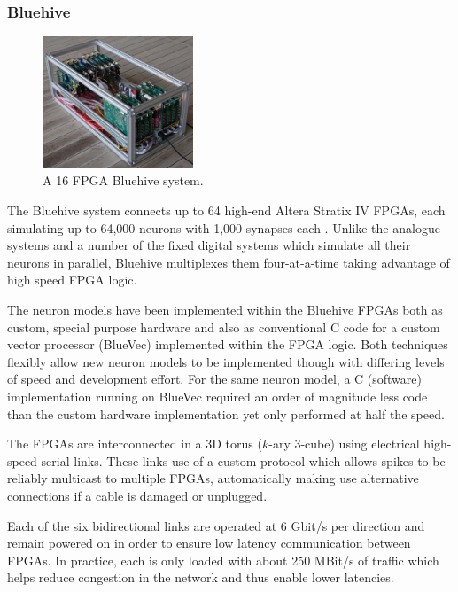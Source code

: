 			\subsubsection{Bluehive}
				
				\begin{figure}
					\center
					\includegraphics[width=0.4\textwidth]{figures/bluehive}
					
					\caption{A 16 FPGA Bluehive system.}
					\label{fig:bluehive}
				\end{figure}
				
				The Bluehive system connects up to 64 high-end Altera Stratix IV FPGAs,
				each simulating up to 64,000 neurons with 1,000 synapses each
				\cite{moore12}. Unlike the analogue systems and a number of the fixed
				digital systems which simulate all their neurons in parallel, Bluehive
				multiplexes them four-at-a-time taking advantage of high speed FPGA
				logic.
				
				The neuron models have been implemented within the Bluehive FPGAs both
				as custom, special purpose hardware and also as conventional C code for
				a custom vector processor (BlueVec) implemented within the FPGA logic.
				Both techniques flexibly allow new neuron models to be implemented
				though with differing levels of speed and development effort. For the
				same neuron model, a C (software) implementation running on BlueVec
				required an order of magnitude less code than the custom hardware
				implementation yet only performed at half the speed.
				
				The FPGAs are interconnected in a 3D torus ($k$-ary 3-cube) using
				electrical high-speed serial links. These links use of a custom protocol
				which allows spikes to be reliably multicast to multiple FPGAs,
				automatically making use alternative connections if a cable is damaged
				or unplugged.
				
				Each of the six bidirectional links are operated at 6 Gbit/s per
				direction and remain powered on in order to ensure low latency
				communication between FPGAs. In practice, each is only loaded with about
				250 MBit/s of traffic which helps reduce congestion in the network and
				thus enable lower latencies.
				
